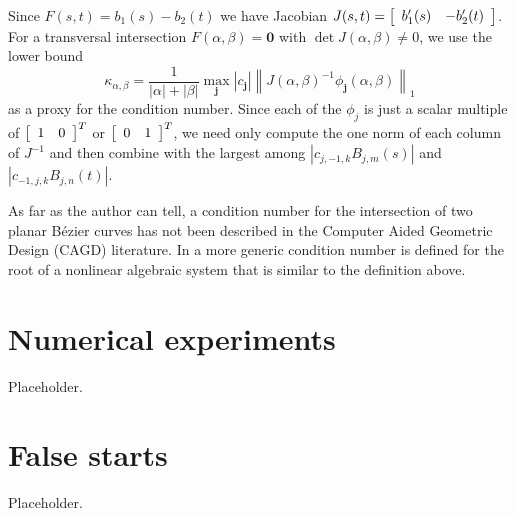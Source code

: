 Since \(F(s, t) = b_1(s) - b_2(t)\) we have Jacobian \(J(s, t) =
\left[ \begin{array}{c c} b_1'(s) & -b_2'(t) \end{array}\right]\). For
a transversal intersection \(F(\alpha, \beta) = \bm{0}\) with
\(\det J(\alpha, \beta) \neq 0\), we use the lower bound
\begin{equation}
\kappa_{\alpha, \beta} = \frac{1}{\left|\alpha\right| + \left|\beta\right|}
  \max_{\bm{j}} \left|c_{\bm{j}}\right| \left \lVert
  J\left(\alpha, \beta\right)^{-1}
  \phi_{\bm{j}}(\alpha, \beta)\right \rVert_1
\end{equation}
as a proxy for the condition number. Since each of the
\(\phi_j\) is just a scalar multiple of
\(\left[ \begin{array}{c c} 1 & 0 \end{array}\right]^T\) or
\(\left[ \begin{array}{c c} 0 & 1 \end{array}\right]^T\), we need only
compute the one norm of each column of \(J^{-1}\) and then combine
with the largest among \(\left|c_{j, -1, k} B_{j, m}(s)\right|\) and
\(\left|c_{-1, j, k} B_{j, n}(t)\right|\).

As far as the author can tell,
a condition number for the intersection of two planar B\'{e}zier curves
has not been described in the Computer Aided Geometric Design (CAGD)
literature. In \cite[Chapter~25, Equation 25.11]{Higham2002}
a more generic condition number is defined for the root of a nonlinear
algebraic system that is similar to the definition above.

\section{Numerical experiments}\label{sec:compensated-numerical}

Placeholder.

\section{False starts}\label{sec:false-starts}

Placeholder.
